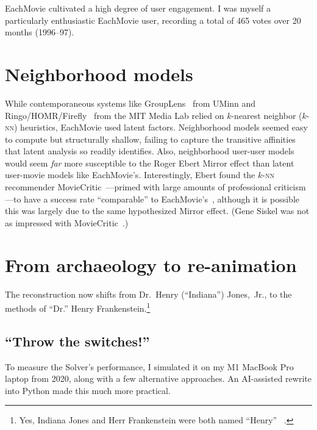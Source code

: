 \documentclass[sigconf,authorversion,screen,microtype={protrusion=true,expansion,kerning,spacing}]{acmart}
\begin{document}
EachMovie cultivated a high degree of user engagement. I was myself a particularly enthusiastic EachMovie user, recording a total of 465 votes over 20 months (1996--97).

\section{Neighborhood models}
\label{section:Other_approaches}

While contemporaneous systems like GroupLens~\cite{Resnick1994} \cite{konstan1997grouplens} from UMinn and Ringo/\allowbreak{}HOMR/\allowbreak{}Firefly~\cite{Shardanand1995} from the MIT Media Lab relied on $k$-nearest neighbor ($k$-\textsc{nn}) heuristics, EachMovie used latent factors. Neighborhood models seemed easy to compute but structurally shallow, failing to capture the transitive affinities that latent analysis so readily identifies. Also, neighborhood user-user models would seem \emph{far} more susceptible to the Roger Ebert Mirror effect than latent user-movie models like EachMovie's. Interestingly, Ebert found the $k$-\textsc{nn} recommender MovieCritic~\cite{Resnick1997}---primed with large amounts of professional criticism---to have a success rate ``comparable'' to EachMovie’s~\cite{ebert1996critical}, although it is possible this was largely due to the same hypothesized Mirror effect. (Gene Siskel was not as impressed with MovieCritic~\cite{Siskel1996}.)


\section{From archaeology to re-animation}
\label{section:Re_animation}

The reconstruction now shifts from Dr.~Henry (``Indiana'') Jones,~Jr., to the methods of ``Dr.'' Henry Frankenstein.\footnote{Yes, Indiana Jones and Herr Frankenstein were both named ``Henry''~\cite{Spielberg1989} \cite{Whale1931}.}

\subsection{``Throw the switches!''}
\label{section:SimulatedResults}

To measure the Solver's performance, I simulated it on my M1 MacBook Pro laptop from 2020, along with a few alternative approaches. An AI-assisted rewrite into Python made this much more practical.
\end{document}
